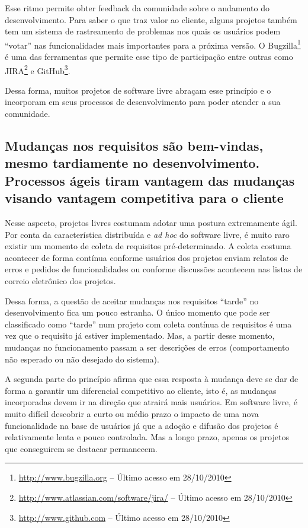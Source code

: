 Esse ritmo permite obter feedback da comunidade sobre o andamento do
desenvolvimento. Para saber o que traz valor ao cliente, alguns
projetos também tem um sistema de rastreamento de problemas nos quais
os usuários podem ``votar'' nas funcionalidades mais importantes para
a próxima versão. O Bugzilla\footnote{\url{http://www.bugzilla.org} --
  Último acesso em 28/10/2010} é uma das ferramentas que permite esse
tipo de participação entre outras como
JIRA\footnote{\url{http://www.atlassian.com/software/jira/} -- Último
  acesso em 28/10/2010} e GitHub\footnote{\url{http://www.github.com}
  -- Último acesso em 28/10/2010}.

Dessa forma, muitos projetos de software livre abraçam esse princípio
e o incorporam em seus processos de desenvolvimento para poder atender
a sua comunidade.

\subsection[Aceitar as mudanças]{Mudanças nos requisitos são
  bem-vindas, mesmo tardiamente no desenvolvimento.  Processos ágeis
  tiram vantagem das mudanças visando vantagem competitiva para o
  cliente}

Nesse aspecto, projetos livres costumam adotar uma postura
extremamente ágil. Por conta da característica distribuída e
\textit{ad hoc} do software livre, é muito raro existir um momento de
coleta de requisitos pré-determinado. A coleta costuma acontecer de
forma contínua conforme usuários dos projetos enviam relatos de erros
e pedidos de funcionalidades ou conforme discussões acontecem nas
listas de correio eletrônico dos projetos.

Dessa forma, a questão de aceitar mudanças nos requisitos ``tarde'' no
desenvolvimento fica um pouco estranha. O único momento que pode ser
classificado como ``tarde'' num projeto com coleta contínua de
requisitos é uma vez que o requisito já estiver implementado. Mas, a
partir desse momento, mudanças no funcionamento passam a ser
descrições de erros (comportamento não esperado ou não desejado do
sistema).

A segunda parte do princípio afirma que essa resposta à mudança
deve se dar de forma a garantir um diferencial competitivo ao cliente,
isto é, as mudanças incorporadas devem ir na direção que atrairá mais
usuários. Em software livre, é muito difícil descobrir a curto ou
médio prazo o impacto de uma nova funcionalidade na base de usuários
já que a adoção e difusão dos projetos é relativamente lenta e pouco
controlada. Mas a longo prazo, apenas os projetos que conseguirem se
destacar permanecem.

